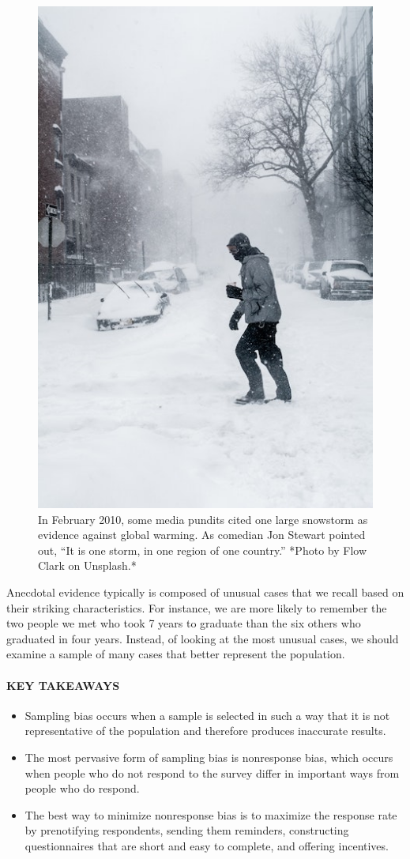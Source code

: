 \documentclass[
]{krantz}
\providecommand{\tightlist}{%
  \setlength{\itemsep}{0pt}\setlength{\parskip}{0pt}}
\begin{document}
\begin{figure}

{\centering \includegraphics[width=0.35\linewidth]{images/sampling/snow} 

}

\caption{In February 2010, some media pundits cited one large snowstorm as evidence against global warming. As comedian Jon Stewart pointed out, “It is one storm, in one region of one country.” *Photo by Flow Clark on Unsplash.*}\label{fig:snow}
\end{figure}

Anecdotal evidence typically is composed of unusual cases that we recall based on their striking characteristics. For instance, we are more likely to remember the two people we met who took 7 years to graduate than the six others who graduated in four years. Instead, of looking at the most unusual cases, we should examine a sample of many cases that better represent the population.

\hypertarget{key-takeaways-18}{%
\paragraph*{KEY TAKEAWAYS}\label{key-takeaways-18}}

\begin{itemize}
\tightlist
\item
  Sampling bias occurs when a sample is selected in such a way that it is not representative of the population and therefore produces inaccurate results.
\item
  The most pervasive form of sampling bias is nonresponse bias, which occurs when people who do not respond to the survey differ in important ways from people who do respond.
\item
  The best way to minimize nonresponse bias is to maximize the response rate by prenotifying respondents, sending them reminders, constructing questionnaires that are short and easy to complete, and offering incentives.
\end{itemize}
\end{document}

